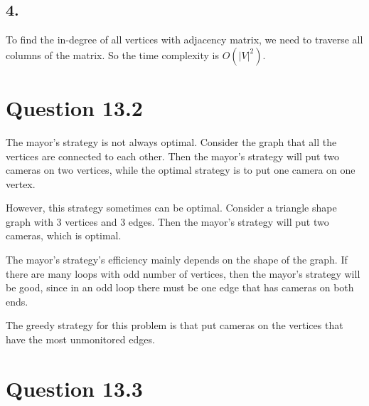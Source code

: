 \documentclass[a4paper,12pt]{article}
\begin{document}
\subsection*{4.}

To find the in-degree of all vertices with adjacency matrix, we need to traverse all columns of the matrix.
So the time complexity is $O(|V|^2)$.

\section*{Question 13.2}

The mayor's strategy is not always optimal.
Consider the graph that all the vertices are connected to each other.
Then the mayor's strategy will put two cameras on two vertices, while the optimal strategy is to put one camera on one vertex.

However, this strategy sometimes can be optimal.
Consider a triangle shape graph with 3 vertices and 3 edges.
Then the mayor's strategy will put two cameras, which is optimal.

The mayor's strategy's efficiency mainly depends on the shape of the graph.
If there are many loops with odd number of vertices, then the mayor's strategy will be good, since in an odd loop there must be one edge that has cameras on both ends.

The greedy strategy for this problem is that put cameras on the vertices that have the most unmonitored edges.
\section*{Question 13.3}
\end{document}
